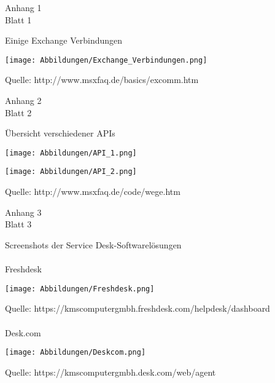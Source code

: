 \begin{flushright}
Anhang 1\\
Blatt 1\\
\end{flushright}

\noindent Einige Exchange Verbindungen
\begin{flushleft}
\texttt{[image: Abbildungen/Exchange\_Verbindungen.png]}
\end{flushleft}
\label{Exchange Verbindung}
\noindent Quelle: http://www.msxfaq.de/basics/excomm.htm

\newpage

\begin{flushright}
Anhang 2\\
Blatt 2\\
\end{flushright}

\noindent Übersicht verschiedener APIs
\begin{flushleft}
\texttt{[image: Abbildungen/API\_1.png]}
\end{flushleft}
\label{API_1}
\begin{flushleft}
\texttt{[image: Abbildungen/API\_2.png]}
\end{flushleft}
\noindent Quelle: http://www.msxfaq.de/code/wege.htm

\newpage

\begin{flushright}
Anhang 3\\
Blatt 3\\
\label{Anhang3}
\end{flushright}

\noindent Screenshots der Service Desk-Softwarelösungen \\\\
\noindent Freshdesk
\begin{flushleft}
\texttt{[image: Abbildungen/Freshdesk.png]}
\end{flushleft}
\noindent Quelle: https://kmscomputergmbh.freshdesk.com/helpdesk/dashboard \\\\

\noindent Desk.com
\begin{flushleft}
\texttt{[image: Abbildungen/Deskcom.png]}
\end{flushleft}
\noindent Quelle: https://kmscomputergmbh.desk.com/web/agent \\\\


